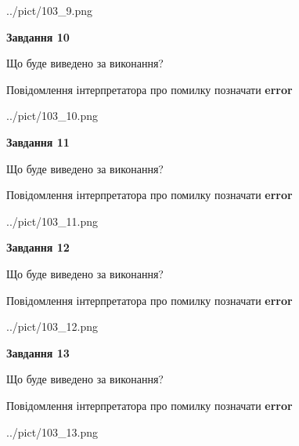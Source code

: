 \documentclass[11pt, ukrainian]{article}
\begin{document}
{\begin {large}
\begin{center}
	{../pict/103_9.png}
\end{center}
\newpage

{\begin {center}\textbf{Завдання 10}\end {center}}\par
Що буде виведено за виконання? \par
Повідомлення інтерпретатора про помилку позначати \textbf{error}

\begin{center}
	{../pict/103_10.png}
\end{center}
\newpage

{\begin {center}\textbf{Завдання 11}\end {center}}\par
Що буде виведено за виконання? \par
Повідомлення інтерпретатора про помилку позначати \textbf{error}

\begin{center}
	{../pict/103_11.png}
\end{center}
\newpage

{\begin {center}\textbf{Завдання 12}\end {center}}\par
Що буде виведено за виконання? \par
Повідомлення інтерпретатора про помилку позначати \textbf{error}

\begin{center}
	{../pict/103_12.png}
\end{center}
\newpage

{\begin {center}\textbf{Завдання 13}\end {center}}\par
Що буде виведено за виконання? \par
Повідомлення інтерпретатора про помилку позначати \textbf{error}

\begin{center}
	{../pict/103_13.png}
\end{center}
\newpage


\end{large}}
\end{document}
